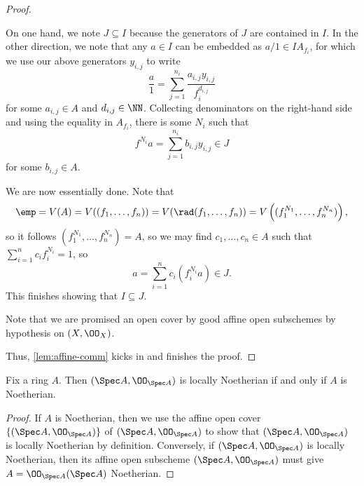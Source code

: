 \documentclass[../notes.tex]{subfiles}
\begin{document}
\begin{proof}
\begin{listroman}
		On one hand, we note $J\subseteq I$ because the generators of $J$ are contained in $I$. In the other direction, we note that any $a\in I$ can be embedded as $a/1\in IA_{f_i}$, for which we use our above generators $y_{i,j}$ to write
		\[\frac a1=\sum_{j=1}^{n_i}\frac{a_{i,j}y_{i,j}}{f_i^{d_{i,j}}}\]
		for some $a_{i,j}\in A$ and $d_{i,j}\in\NN$. Collecting denominators on the right-hand side and using the equality in $A_{f_i}$, there is some $N_i$ such that
		\[f^{N_i}a=\sum_{j=1}^{n_i}b_{i,j}y_{i,j}\in J\]
		for some $b_{i,j}\in A$.

		We are now essentially done. Note that
		\[\emp=V(A)=V((f_1,\ldots,f_n))=V(\rad(f_1,\ldots,f_n))=V\left((f_1^{N_1},\ldots,f_n^{N_n})\right),\]
		so it follows $(f_1^{N_1},\ldots,f_n^{N_n})=A$, so we may find $c_1,\ldots,c_n\in A$ such that $\sum_{i=1}^nc_if_i^{N_i}=1$, so
		\[a=\sum_{i=1}^nc_i\left(f_i^{N_i}a\right)\in J.\]
		This finishes showing that $I\subseteq J$.
		\item Note that we are promised an open cover by good affine open subschemes by hypothesis on $(X,\OO_X)$.
	\end{listroman}
	Thus, \autoref{lem:affine-comm} kicks in and finishes the proof.
\end{proof}
\begin{cor}
	Fix a ring $A$. Then $(\Spec A,\OO_{\Spec A})$ is locally Noetherian if and only if $A$ is Noetherian.
\end{cor}
\begin{proof}
	If $A$ is Noetherian, then we use the affine open cover $\{(\Spec A,\OO_{\Spec A})\}$ of $(\Spec A,\OO_{\Spec A})$ to show that $(\Spec A,\OO_{\Spec A})$ is locally Noetherian by definition. Conversely, if $(\Spec A,\OO_{\Spec A})$ is locally Noetherian, then its affine open subscheme $(\Spec A,\OO_{\Spec A})$ must give $A=\OO_{\Spec A}(\Spec A)$ Noetherian.
\end{proof}
\end{document}
